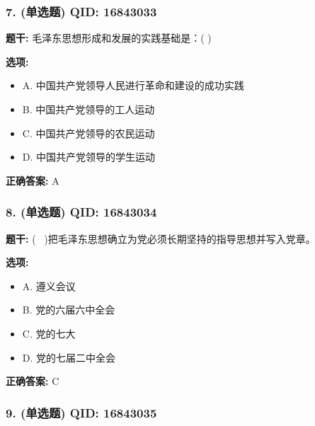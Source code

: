 \documentclass[12pt,UTF8]{ctexart}
\begin{document}
\subsubsection*{7. (单选题) \small QID: 16843033}

\textbf{题干:}
毛泽东思想形成和发展的实践基础是：( )

\textbf{选项:}
\begin{itemize}[leftmargin=*]

  \item A. 中国共产党领导人民进行革命和建设的成功实践

  \item B. 中国共产党领导的工人运动

  \item C. 中国共产党领导的农民运动

  \item D. 中国共产党领导的学生运动

\end{itemize}

\textbf{正确答案:}
A

\vspace{0.3em}\hrulefill\vspace{0.7em}

\subsubsection*{8. (单选题) \small QID: 16843034}

\textbf{题干:}
(  )把毛泽东思想确立为党必须长期坚持的指导思想并写入党章。

\textbf{选项:}
\begin{itemize}[leftmargin=*]

  \item A. 遵义会议

  \item B. 党的六届六中全会

  \item C. 党的七大

  \item D. 党的七届二中全会

\end{itemize}

\textbf{正确答案:}
C

\vspace{0.3em}\hrulefill\vspace{0.7em}

\subsubsection*{9. (单选题) \small QID: 16843035}
\end{document}
